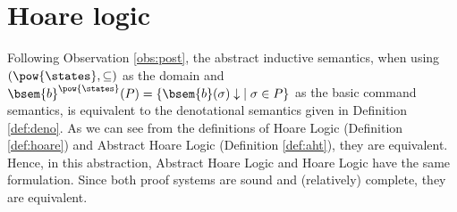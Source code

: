 \section{Hoare logic}
\label{chp:inst-hoare}

Following Observation \ref{obs:post}, the abstract inductive semantics, when 
using $(\pow{\states}, \subseteq)$ as the domain and 
$\bsem{b}^{\pow{\states}}(P) = \{ \bsem{b}(\sigma) \downarrow \; \mid \sigma 
\in P \}$ as the basic command semantics, is equivalent to the denotational 
semantics given in Definition \ref{def:deno}. As we can see from the definitions 
of Hoare Logic (Definition \ref{def:hoare}) and Abstract Hoare Logic (Definition 
\ref{def:aht}), they are equivalent. Hence, in this abstraction, Abstract Hoare 
Logic and Hoare Logic have the same formulation. Since both proof systems are 
sound and (relatively) complete, they are equivalent.
